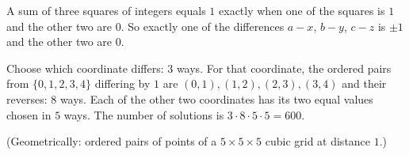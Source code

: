A sum of three squares of integers equals $1$ exactly when one of the squares is $1$ and the other two are $0$. So exactly one of the differences $a-x$, $b-y$, $c-z$ is $\pm1$ and the other two are $0$.

Choose which coordinate differs: $3$ ways. For that coordinate, the ordered pairs from $\{0,1,2,3,4\}$ differing by $1$ are $(0,1),(1,2),(2,3),(3,4)$ and their reverses: $8$ ways. Each of the other two coordinates has its two equal values chosen in $5$ ways. The number of solutions is $3\cdot8\cdot5\cdot5=\boxed{600}$.

(Geometrically: ordered pairs of points of a $5\times5\times5$ cubic grid at distance $1$.)
